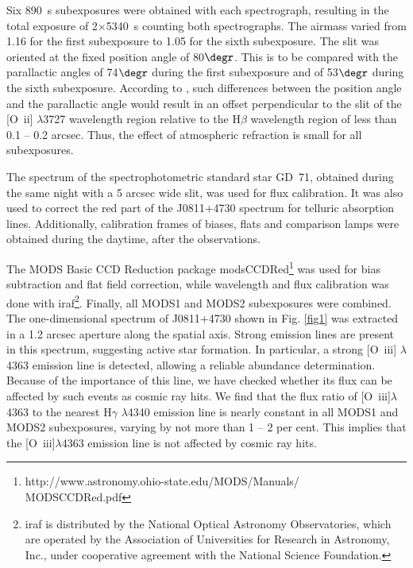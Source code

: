 \documentclass[useAMS,usenatbib]{mn2e}
\begin{document}
Six 890~s subexposures were obtained with each spectrograph, resulting
in the total exposure of 2$\times$5340~s counting both spectrographs.
The airmass varied from 1.16 for the first subexposure to 1.05 for
the sixth subexposure. 
The slit was oriented at the fixed position angle of 80${\degr}$. This is to be 
compared with the parallactic angles of 74${\degr}$ during the first subexposure
and of 53${\degr}$ during the sixth subexposure. According to \citet{F82}, such
differences between the position angle and the parallactic angle would result in
an offset perpendicular to the slit of the [O~{\sc ii}] $\lambda$3727 
wavelength region relative to the H$\beta$ wavelength region of less than 
0.1 -- 0.2 arcsec. Thus, 
the effect of atmospheric refraction is small for all subexposures. 

The spectrum of the spectrophotometric standard star GD~71, obtained during 
the same night with a 5 arcsec wide slit, was used for flux calibration.
It was also used to correct the red part of the 
J0811$+$4730 spectrum for telluric absorption lines. 
Additionally, calibration frames of biases, flats and comparison lamps 
were obtained during the daytime, after the observations.

The MODS Basic CCD Reduction package {\sc modsCCDRed}\footnote{http://www.astronomy.ohio-state.edu/MODS/Manuals/ MODSCCDRed.pdf} was used for bias subtraction 
and flat field correction, while wavelength and flux calibration was 
done with {\sc iraf}\footnote{{\sc iraf} is distributed by the 
National Optical Astronomy Observatories, which are operated by the Association
of Universities for Research in Astronomy, Inc., under cooperative agreement 
with the National Science Foundation.}. 
Finally, all MODS1 and MODS2 subexposures were 
combined. The one-dimensional spectrum 
of J0811$+$4730 shown in Fig. \ref{fig1} was extracted 
in a 1.2 arcsec aperture along the spatial axis. Strong emission lines are 
present in this spectrum, suggesting active star formation.
In particular, a strong [O~{\sc iii}] $\lambda$4363 emission line is 
detected, allowing a reliable abundance determination. Because of the
importance of this line, we have checked whether its flux can be affected by 
such events as cosmic ray hits. We find that the flux ratio of 
[O~{\sc iii}]$\lambda$4363 to the nearest H$\gamma$ $\lambda$4340 emission line 
is nearly constant in all MODS1 and MODS2 subexposures, varying by not more than
1 -- 2 per cent. This implies that the [O~{\sc iii}]$\lambda$4363 emission line 
is not affected by cosmic ray hits.
\end{document}
